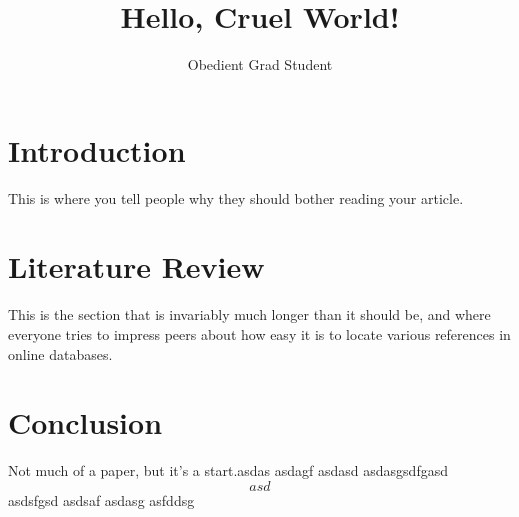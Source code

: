 \documentclass{article}
\title{Hello, Cruel World!}
\author{Obedient Grad Student}
\begin{document}
\maketitle

\section{Introduction}
This is where you tell people why they should bother reading your article.

\section{Literature Review}
This is the section that is invariably much longer than it should be, and
where everyone tries to impress peers about how easy it is to locate various
references in online databases.

\section{Conclusion}
Not much of a paper, but it's a start.asdas
asdagf
asdasd
asdasgsdfgasd
\begin{equation}
  asd
\end{equation}
asdsfgsd asdsaf asdasg asfddsg
\end{document}
